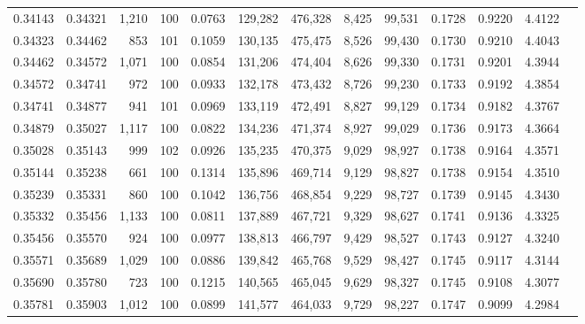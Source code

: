 \begin{tabular}{rrrrrrrrrrrrr}
0.34143 & 0.34321 & 1,210 & 100 &                                     0.0763 & 129,282 & 476,328 &   8,425 &  99,531 & 0.1728 & 0.9220 & 4.4122 \\
0.34323 & 0.34462 &   853 & 101 &                                     0.1059 & 130,135 & 475,475 &   8,526 &  99,430 & 0.1730 & 0.9210 & 4.4043 \\
0.34462 & 0.34572 & 1,071 & 100 &                                     0.0854 & 131,206 & 474,404 &   8,626 &  99,330 & 0.1731 & 0.9201 & 4.3944 \\
0.34572 & 0.34741 &   972 & 100 &                                     0.0933 & 132,178 & 473,432 &   8,726 &  99,230 & 0.1733 & 0.9192 & 4.3854 \\
0.34741 & 0.34877 &   941 & 101 &                                     0.0969 & 133,119 & 472,491 &   8,827 &  99,129 & 0.1734 & 0.9182 & 4.3767 \\
0.34879 & 0.35027 & 1,117 & 100 &                                     0.0822 & 134,236 & 471,374 &   8,927 &  99,029 & 0.1736 & 0.9173 & 4.3664 \\
0.35028 & 0.35143 &   999 & 102 &                                     0.0926 & 135,235 & 470,375 &   9,029 &  98,927 & 0.1738 & 0.9164 & 4.3571 \\
0.35144 & 0.35238 &   661 & 100 &                                     0.1314 & 135,896 & 469,714 &   9,129 &  98,827 & 0.1738 & 0.9154 & 4.3510 \\
0.35239 & 0.35331 &   860 & 100 &                                     0.1042 & 136,756 & 468,854 &   9,229 &  98,727 & 0.1739 & 0.9145 & 4.3430 \\
0.35332 & 0.35456 & 1,133 & 100 &                                     0.0811 & 137,889 & 467,721 &   9,329 &  98,627 & 0.1741 & 0.9136 & 4.3325 \\
0.35456 & 0.35570 &   924 & 100 &                                     0.0977 & 138,813 & 466,797 &   9,429 &  98,527 & 0.1743 & 0.9127 & 4.3240 \\
0.35571 & 0.35689 & 1,029 & 100 &                                     0.0886 & 139,842 & 465,768 &   9,529 &  98,427 & 0.1745 & 0.9117 & 4.3144 \\
0.35690 & 0.35780 &   723 & 100 &                                     0.1215 & 140,565 & 465,045 &   9,629 &  98,327 & 0.1745 & 0.9108 & 4.3077 \\
0.35781 & 0.35903 & 1,012 & 100 &                                     0.0899 & 141,577 & 464,033 &   9,729 &  98,227 & 0.1747 & 0.9099 & 4.2984 \\

\end{tabular}
